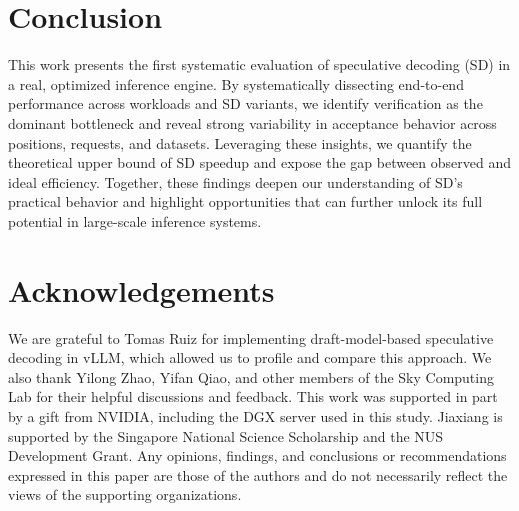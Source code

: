 \section{Conclusion}
This work presents the first systematic evaluation of speculative decoding (SD) in a real, optimized inference engine. By systematically dissecting end-to-end performance across workloads and SD variants, we identify verification as the dominant bottleneck and reveal strong variability in acceptance behavior across positions, requests, and datasets. Leveraging these insights, we quantify the theoretical upper bound of SD speedup and expose the gap between observed and ideal efficiency. Together, these findings deepen our understanding of SD’s practical behavior and highlight opportunities that can further unlock its full potential in large-scale inference systems.

\section{Acknowledgements}
We are grateful to Tomas Ruiz for implementing draft-model-based speculative decoding in vLLM, which allowed us to profile and compare this approach. We also thank Yilong Zhao, Yifan Qiao, and other members of the Sky Computing Lab for their helpful discussions and feedback. This work was supported in part by a gift from NVIDIA, including the DGX server used in this study. Jiaxiang is supported by the Singapore National Science Scholarship and the NUS Development Grant. Any opinions, findings, and conclusions or recommendations expressed in this paper are those of the authors and do not necessarily reflect the views of the supporting organizations.